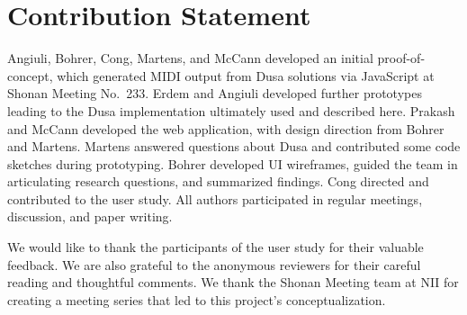 \documentclass[sigplan,screen]{acmart}
\begin{document}










\section*{Contribution Statement}
Angiuli, Bohrer, Cong, Martens, and McCann developed
an initial proof-of-concept, which generated MIDI output from Dusa
solutions via JavaScript at Shonan Meeting No.~233.
Erdem and Angiuli developed further prototypes leading to the 
Dusa implementation ultimately used and described here.
Prakash and McCann developed the web application, with design
direction from Bohrer and Martens.
Martens answered questions about Dusa and contributed some code
sketches during prototyping.
Bohrer developed UI wireframes, guided the team in articulating research
questions, and summarized findings.
Cong directed and contributed to the user study.
All authors participated in regular meetings, discussion, and paper writing.

\begin{acks}
We would like to thank the participants of the user study for their valuable feedback.
We are also grateful to the anonymous reviewers for their careful reading and thoughtful comments.
We thank the Shonan Meeting team at NII for creating a meeting series that led to this project's conceptualization.
\end{acks}



\end{document}
